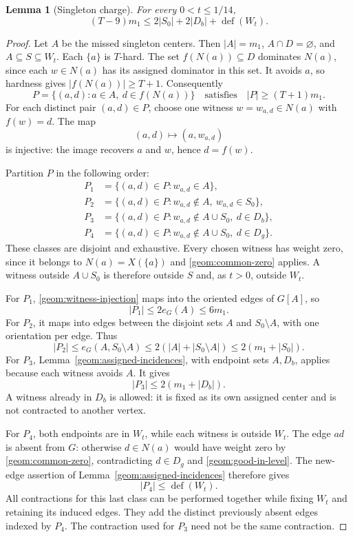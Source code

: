 \documentclass[11pt,a4paper]{article}
\newtheorem{lemma}[lemma]{Lemma}
\theoremstyle{definition}
\theoremstyle{remark}
\DeclareMathOperator{\Def}{def}
\begin{document}
\begin{lemma}[Singleton charge]\label{geom:singleton-charge}
For every $0<t\leq1/14$,
\begin{equation}\label{geom:singleton-charge-eq}
 (T-9)m_1\leq2|S_0|+2|D_b|+\Def(W_t).
\end{equation}
\end{lemma}
\begin{proof}
Let $A$ be the missed singleton centers. Then $|A|=m_1$,
$A\cap D=\varnothing$, and $A\subseteq S\subseteq W_t$.
Each $\{a\}$ is $T$-hard. The set $f(N(a))\subseteq D$ dominates
$N(a)$, since each $w\in N(a)$ has its assigned dominator in this set.
It avoids $a$, so hardness gives $|f(N(a))|\geq T+1$.
Consequently
\[
 P=\{(a,d):a\in A,\ d\in f(N(a))\}
 \quad\text{satisfies}\quad |P|\geq(T+1)m_1.
\]
For each distinct pair $(a,d)\in P$, choose one witness
$w=w_{a,d}\in N(a)$ with $f(w)=d$. The map
\begin{equation}\label{geom:witness-injection}
 (a,d)\longmapsto(a,w_{a,d})
\end{equation}
is injective: the image recovers $a$ and $w$, hence $d=f(w)$.

Partition $P$ in the following order:
\begin{align*}
 P_1&=\{(a,d)\in P:w_{a,d}\in A\},\\
 P_2&=\{(a,d)\in P:w_{a,d}\notin A,\ w_{a,d}\in S_0\},\\
 P_3&=\{(a,d)\in P:w_{a,d}\notin A\cup S_0,\ d\in D_b\},\\
 P_4&=\{(a,d)\in P:w_{a,d}\notin A\cup S_0,\ d\in D_g\}.
\end{align*}
These classes are disjoint and exhaustive. Every chosen witness has
weight zero, since it belongs to $N(a)=X(\{a\})$ and
\eqref{geom:common-zero} applies. A witness outside $A\cup S_0$ is
therefore outside $S$ and, as $t>0$, outside $W_t$.

For $P_1$, \eqref{geom:witness-injection} maps into the oriented edges
of $G[A]$, so
\[
 |P_1|\leq2e_G(A)\leq6m_1.
\]
For $P_2$, it maps into edges between the disjoint sets $A$ and
$S_0\setminus A$, with one orientation per edge. Thus
\[
 |P_2|\leq e_G(A,S_0\setminus A)
 \leq2(|A|+|S_0\setminus A|)\leq2(m_1+|S_0|).
\]
For $P_3$, Lemma~\ref{geom:assigned-incidences}, with endpoint sets
$A,D_b$, applies because each witness avoids $A$. It gives
\[
 |P_3|\leq2(m_1+|D_b|).
\]
A witness already in $D_b$ is allowed: it is fixed as its own assigned
center and is not contracted to another vertex.

For $P_4$, both endpoints are in $W_t$, while each witness is outside
$W_t$. The edge $ad$ is absent from $G$: otherwise $d\in N(a)$ would
have weight zero by \eqref{geom:common-zero}, contradicting
$d\in D_g$ and \eqref{geom:good-in-level}. The new-edge assertion of
Lemma~\ref{geom:assigned-incidences} therefore gives
\[
 |P_4|\leq\Def(W_t).
\]
All contractions for this last class can be performed together while
fixing $W_t$ and retaining its induced edges. They add the distinct
previously absent edges indexed by $P_4$. The contraction used for
$P_3$ need not be the same contraction.


\end{proof}
\end{document}
